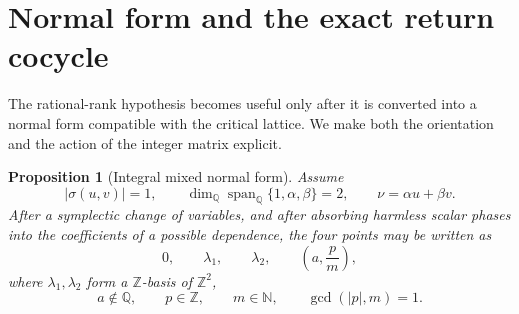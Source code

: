 \documentclass[reqno]{amsart}
\newtheorem{proposition}[theorem]{Proposition}
\theoremstyle{remark}
\numberwithin{equation}{section}
\newcommand{\Q}{\mathbb{Q}}
\newcommand{\Z}{\mathbb{Z}}
\begin{document}
\section{Normal form and the exact return cocycle}
\label{sec:normal-return}

The rational-rank hypothesis becomes useful only after it is converted into a
normal form compatible with the critical lattice. We make both the orientation
and the action of the integer matrix explicit.

\begin{proposition}[Integral mixed normal form]
\label{prop:normal-form}
Assume
\[
  |\sigma(u,v)|=1,
  \qquad
  \dim_{\Q}\operatorname{span}_{\Q}\{1,\alpha,\beta\}=2,
  \qquad
  \nu=\alpha u+\beta v.
\]
After a symplectic change of variables, and after absorbing harmless scalar
phases into the coefficients of a possible dependence, the four points may be
written as
\[
  0,\qquad
  \lambda_1,\qquad
  \lambda_2,\qquad
  \left(a,\frac{p}{m}\right),
\]
where \(\lambda_1,\lambda_2\) form a \(\Z\)-basis of \(\Z^2\),
\[
  a\notin\Q,
  \qquad p\in\Z,
  \qquad m\in\mathbb N,
  \qquad \gcd(|p|,m)=1.
\]
\end{proposition}
\end{document}
